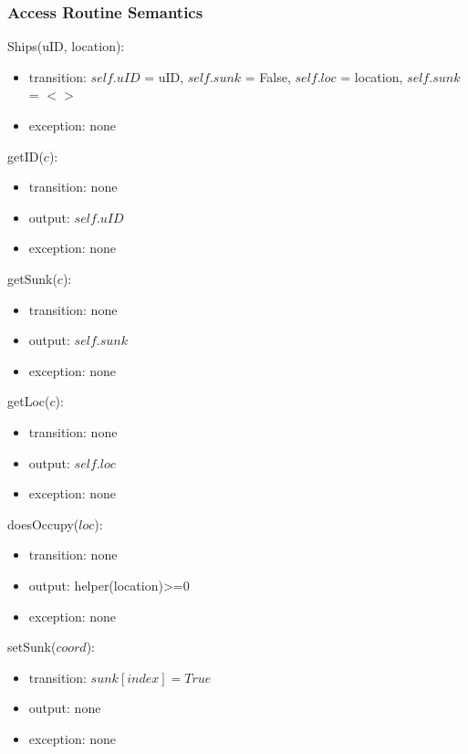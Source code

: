 \documentclass[12pt,fleqn]{article}
\begin{document}
    \subsubsection* {Access Routine Semantics}

    Ships(uID, location):
    \begin{itemize}
    \item transition: $self.uID$ = uID, $self.sunk$ = False, $self.loc$ = location, $self.sunk$ = $< >$
    \item exception: none
    \end{itemize}

    getID($c$):
    \begin{itemize}
    \item transition: none 
    \item output: $self.uID$
    \item exception: none 
    \end{itemize}

    getSunk($c$):
    \begin{itemize}
    \item transition: none 
    \item output: $self.sunk$
    \item exception: none 
    \end{itemize}    

    getLoc($c$):
    \begin{itemize}
    \item transition: none 
    \item output: $self.loc$
    \item exception: none 
    \end{itemize}    

    doesOccupy($loc$):
    \begin{itemize}
    \item transition: none  
    \item output: helper(location)>=0
    \item exception: none 
    \end{itemize}        

    setSunk($coord$):
    \begin{itemize}
    \item transition: $sunk[index] = True$
    \item output: none 
    \item exception: none 
    \end{itemize}            
\end{document}

